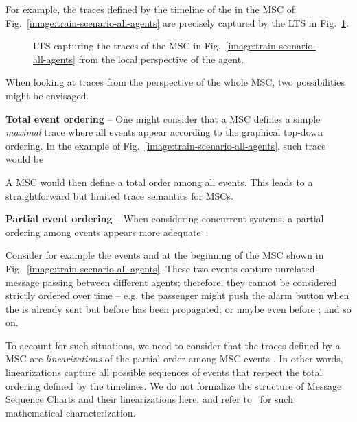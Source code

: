 For example, the traces defined by the timeline of the  in the MSC of Fig.~\ref{image:train-scenario-all-agents} are precisely captured by the LTS in Fig.~\ref{image:local-traces-lts}. 

\begin{figure}\centering
{}
\caption[LTS capturing the traces of a MSC from the local perspective of an agent]{LTS capturing the traces of the MSC in Fig.~\ref{image:train-scenario-all-agents} from the local perspective of the  agent.\label{image:local-traces-lts}}
\end{figure}

When looking at traces from the perspective of the whole MSC, two possibilities might be envisaged.

\noindent \textbf{Total event ordering} -- One might consider that a MSC defines a simple \emph{maximal} trace where all events appear according to the graphical top-down ordering. In the example of Fig.~\ref{image:train-scenario-all-agents}, such trace would be

\begin{center}\end{center} 

A MSC would then define a total order among all events. This leads to a straightforward but limited trace semantics for MSCs.

\noindent \textbf{Partial event ordering} -- When considering concurrent systems, a partial ordering among events appears more adequate~\cite{ITU:1996, Uchitel:2003}. 

Consider for example the events  and  at the beginning of the MSC shown in Fig.~\ref{image:train-scenario-all-agents}. These two events capture unrelated message passing between different agents; therefore, they cannot be considered strictly ordered over time -- e.g. the passenger might push the alarm button when the  is already sent but before  has been propagated; or maybe even before ; and so on. 

To account for such situations, we need to consider that the traces defined by a MSC are \emph{linearizations} of the partial order among MSC events \cite{Alur:2000}. In other words, linearizations capture all possible sequences of events that respect the total ordering defined by the timelines. We do not formalize the structure of Message Sequence Charts and their linearizations here, and refer to~\cite{Uchitel:2003} for such mathematical characterization. 

